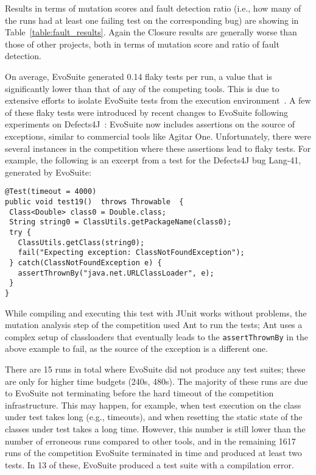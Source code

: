 \documentclass[10pt,conference,compsocconf]{IEEEtran}
\newcommand{\EVOSUITE}{{\sc EvoSuite}\xspace}
\begin{document}
Results in terms of mutation scores and fault detection ratio (i.e.,
how many of the runs had at least one failing test on the
corresponding bug) are showing in
Table~\ref{table:fault_results}. Again the Closure results are
generally worse than those of other projects, both in terms of
mutation score and ratio of fault detection.

On average, \EVOSUITE generated 0.14 flaky tests per run, a value that
is significantly lower than that of any of the competing tools. This
is due to extensive efforts to isolate \EVOSUITE tests from the
execution environment~\cite{arcuri2014automated}. A few of these flaky
tests were introduced by recent changes to \EVOSUITE following
experiments on Defects4J~\cite{shamshiri2015automatically}: \EVOSUITE
now includes assertions on the source of exceptions, similar to
commercial tools like Agitar One. %
Unfortunately, there were several instances in the competition where these assertions
lead to flaky tests. For example, the following is an excerpt from a
test for the Defects4J bug Lang-41, generated by \EVOSUITE:

\begin{lstlisting}
@Test(timeout = 4000)
public void test19()  throws Throwable  {
 Class<Double> class0 = Double.class;
 String string0 = ClassUtils.getPackageName(class0);
 try { 
   ClassUtils.getClass(string0);
   fail("Expecting exception: ClassNotFoundException"); 
 } catch(ClassNotFoundException e) {
   assertThrownBy("java.net.URLClassLoader", e);
 }
}
\end{lstlisting}

While compiling and executing this test with JUnit works without
problems, the mutation analysis step of the competition used Ant to
run the tests; Ant uses a complex setup of classloaders that
eventually leads to the \texttt{assertThrownBy} in the above example
to fail, as the source of the exception is a different one.

There are 15 runs in total where \EVOSUITE did not produce any test
suites; these are only for higher time budgets (240s, 480s). The
majority of these runs are due to \EVOSUITE not terminating before the
hard timeout of the competition infrastructure. This may happen, for
example, when test execution on the class under test takes long (e.g.,
timeouts), and when resetting the static state of the classes under
test takes a long time. However, this number is still lower than the
number of erroneous runs compared to other tools, and in the remaining
1617 runs of the competition \EVOSUITE terminated in time and produced
at least two tests. In 13 of these, \EVOSUITE produced a test suite
with a compilation error.
\end{document}
